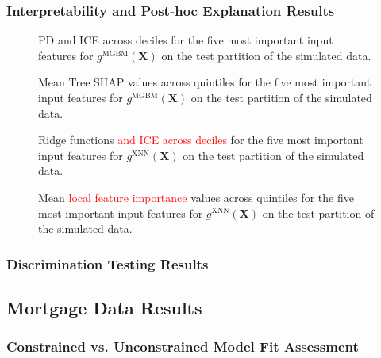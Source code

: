 \documentclass[information,article,submit,moreauthors,pdftex]{definitions/mdpi}
\begin{document}
\subsubsection{Interpretability and Post-hoc Explanation Results}


\begin{figure}[H]
\centering
\label{fig:sim_mgbm_glob}
\caption{PD and ICE across deciles for the five most important input features for $g^\text{MGBM}(\mathbf{X})$ on the test partition of the simulated data.}
\end{figure}   

\begin{figure}[H]
\centering
\label{fig:sim_mgbm_loc}
\caption{Mean Tree SHAP values across quintiles for the five most important input features for $g^\text{MGBM}(\mathbf{X})$ on the test partition of the simulated data.}
\end{figure}   

\begin{figure}[H]
\centering
\label{fig:sim_xnn_glob}
\caption{Ridge functions \textcolor{red}{and ICE across deciles} for the five most important input features for $g^\text{XNN}(\mathbf{X})$ on the test partition of the simulated data.}
\end{figure}   

\begin{figure}[H]
\centering
\label{fig:fig:sim_xnn_glob}
\caption{Mean \textcolor{red}{local feature importance} values across quintiles for the five most important input features for $g^\text{XNN}(\mathbf{X})$ on the test partition of the simulated data.}
\end{figure}  

\subsubsection{Discrimination Testing Results}

\subsection{Mortgage Data Results}

\subsubsection{Constrained vs. Unconstrained Model Fit Assessment}
\end{document}
